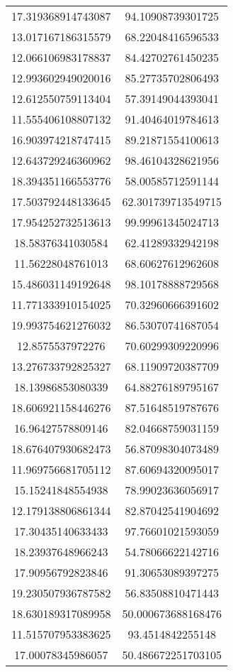 \begin{table}
\begin{tabular}{cc}
17.319368914743087 & 94.10908739301725 \\
13.017167186315579 & 68.22048416596533 \\
12.066106983178837 & 84.42702761450235 \\
12.993602949020016 & 85.27735702806493 \\
12.612550759113404 & 57.39149044393041 \\
11.555406108807132 & 91.40464019784613 \\
16.903974218747415 & 89.21871554100613 \\
12.643729246360962 & 98.46104328621956 \\
18.394351166553776 & 58.00585712591144 \\
17.503792448133645 & 62.301739713549715 \\
17.954252732513613 & 99.99961345024713 \\
18.58376341030584 & 62.41289332942198 \\
11.56228048761013 & 68.60627612962608 \\
15.486031149192648 & 98.10178888729568 \\
11.771333910154025 & 70.32960666391602 \\
19.993754621276032 & 86.53070741687054 \\
12.8575537972276 & 70.60299309220996 \\
13.276733792825327 & 68.11909720387709 \\
18.13986853080339 & 64.88276189795167 \\
18.606921158446276 & 87.51648519787676 \\
16.96427578809146 & 82.04668759031159 \\
18.676407930682473 & 56.87098304073489 \\
11.969756681705112 & 87.60694320095017 \\
15.15241848554938 & 78.99023636056917 \\
12.179138806861344 & 82.87042541904692 \\
17.30435140633433 & 97.76601021593059 \\
18.23937648966243 & 54.78066622142716 \\
17.90956792823846 & 91.30653089397275 \\
19.230507936787582 & 56.83508810471443 \\
18.630189317089958 & 50.000673688168476 \\
11.515707953383625 & 93.4514842255148 \\
17.00078345986057 & 50.486672251703105 \\

\end{tabular}
\end{table}
